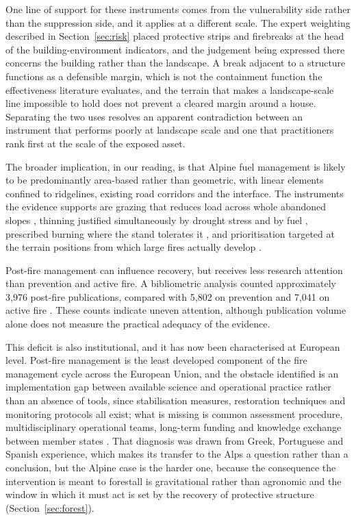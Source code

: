 \documentclass[11pt,a4paper]{article}
\begin{document}
One line of support for these instruments comes from the vulnerability side rather than the suppression side, and it applies at a different scale. The expert weighting described in Section~\ref{sec:risk} placed protective strips and firebreaks at the head of the building-environment indicators, and the judgement being expressed there concerns the building rather than the landscape. A break adjacent to a structure functions as a defensible margin, which is not the containment function the effectiveness literature evaluates, and the terrain that makes a landscape-scale line impossible to hold does not prevent a cleared margin around a house. Separating the two uses resolves an apparent contradiction between an instrument that performs poorly at landscape scale and one that practitioners rank first at the scale of the exposed asset.

The broader implication, in our reading, is that Alpine fuel management is likely to be predominantly area-based rather than geometric, with linear elements confined to ridgelines, existing road corridors and the interface. The instruments the evidence supports are grazing that reduces load across whole abandoned slopes \citep{rouetleduc_effects_2021}, thinning justified simultaneously by drought stress and by fuel \citep{giuggiola_droughtinduced_2010}, prescribed burning where the stand tolerates it \citep{gamba_prescribed_2025}, and prioritisation targeted at the terrain positions from which large fires actually develop \citep{conedera_linking_2024, krsnik_spatial_2024}.

Post-fire management can influence recovery, but receives less research attention than prevention and active fire. A bibliometric analysis counted approximately 3{,}976 post-fire publications, compared with 5{,}802 on prevention and 7{,}041 on active fire \citep{goncalves_fostering_2025}. These counts indicate uneven attention, although publication volume alone does not measure the practical adequacy of the evidence.

This deficit is also institutional, and it has now been characterised at European level. Post-fire management is the least developed component of the fire management cycle across the European Union, and the obstacle identified is an implementation gap between available science and operational practice rather than an absence of tools, since stabilisation measures, restoration techniques and monitoring protocols all exist; what is missing is common assessment procedure, multidisciplinary operational teams, long-term funding and knowledge exchange between member states \citep{vieira_postfire_2026}. That diagnosis was drawn from Greek, Portuguese and Spanish experience, which makes its transfer to the Alps a question rather than a conclusion, but the Alpine case is the harder one, because the consequence the intervention is meant to forestall is gravitational rather than agronomic and the window in which it must act is set by the recovery of protective structure (Section~\ref{sec:forest}).
\end{document}
